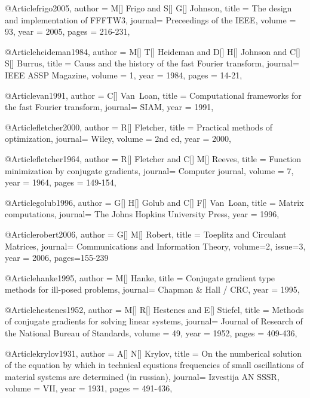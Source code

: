@Article{frigo2005,
  author = 	 {M[] Frigo and S[] G[] Johnson},
  title  = 	 {The design and implementation of FFFTW3},
  journal= 	 {Preceedings of the IEEE},
  volume =	 {93},
  year   = 	 2005,
  pages = 216-231,
}

@Article{heideman1984,
  author = 	 {M[] T[] Heideman and D[] H[] Johnson and C[] S[] Burrus},
  title  = 	 {Causs and the history of the fast {F}ourier transform},
  journal= 	 {IEEE ASSP Magazine},
  volume =	 {1},
  year   = 	 1984,
  pages = 14-21,
}

@Article{van1991,
  author = 	 {C[] Van~Loan},
  title  = 	 {Computational frameworks for the fast {F}ourier transform},
  journal= 	 {SIAM},
  year   = 	 1991,
}

@Article{fletcher2000,
  author = 	 {R[] Fletcher},
  title  = 	 {Practical methods of optimization},
  journal= 	 {Wiley},
  volume =	 {2nd ed},
  year   = 	 2000,
}

@Article{fletcher1964,
  author = 	 {R[] Fletcher and C[] M[] Reeves},
  title  = 	 {Function minimization by conjugate gradients},
  journal= 	 {Computer journal},
  volume =	 {7},
  year   = 	 1964,
  pages = 149-154,
}

@Article{golub1996,
  author = 	 {G[] H[] Golub and C[] F[] Van~Loan},
  title  = 	 {Matrix computations},
  journal= 	 {The Johns Hopkins University Press},
  year   = 	 1996,
}

@Article{robert2006,
  author = 	 {G[] M[] Robert},
  title  = 	 {Toeplitz and Circulant Matrices},
  journal= 	 {Communications and Information Theory},
  volume=2,
  issue=3,
  year   = 	 2006,
  pages={155-239}
}

@Article{hanke1995,
  author = 	 {M[] Hanke},
  title  = 	 {Conjugate gradient type methods for ill-posed problems},
  journal= 	 {Chapman \& Hall / CRC},
  year   = 	 1995,
}

@Article{hestenes1952,
  author = 	 {M[] R[] Hestenes and E[] Stiefel},
  title  = 	 {Methods of conjugate gradients for solving linear systems},
  journal= 	 {Journal of Research of the National Bureau of Standards},
  volume =	 {49},
  year   = 	 1952,
  pages = 	 409-436,
}

@Article{krylov1931,
  author = 	 {A[] N[] Krylov},
  title  = 	 {On the numberical solution of the equation by which in technical equstions frequencies of small oscillations of material systems are determined (in russian)},
  journal= 	 {Izvestija AN SSSR},
  volume =	 {VII},
  year   = 	 1931,
  pages = 491-436,
}

